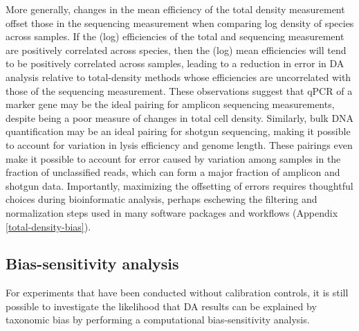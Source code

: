 \documentclass[
]{article}
\begin{document}
More generally, changes in the mean efficiency of the total density measurement offset those in the sequencing measurement when comparing log density of species across samples.
If the (log) efficiencies of the total and sequencing measurement are positively correlated across species, then the (log) mean efficiencies will tend to be positively correlated across samples, leading to a reduction in error in DA analysis relative to total-density methods whose efficiencies are uncorrelated with those of the sequencing measurement.
These observations suggest that qPCR of a marker gene may be the ideal pairing for amplicon sequencing measurements, despite being a poor measure of changes in total cell density.
Similarly, bulk DNA quantification may be an ideal pairing for shotgun sequencing, making it possible to account for variation in lysis efficiency and genome length.
These pairings even make it possible to account for error caused by variation among samples in the fraction of unclassified reads, which can form a major fraction of amplicon and shotgun data.
Importantly, maximizing the offsetting of errors requires thoughtful choices during bioinformatic analysis, perhaps eschewing the filtering and normalization steps used in many software packages and workflows (Appendix \ref{total-density-bias}).

\hypertarget{bias-sensitivity-analysis}{%
\subsection{Bias-sensitivity analysis}\label{bias-sensitivity-analysis}}

For experiments that have been conducted without calibration controls, it is still possible to investigate the likelihood that DA results can be explained by taxonomic bias by performing a computational bias-sensitivity analysis.
\end{document}
